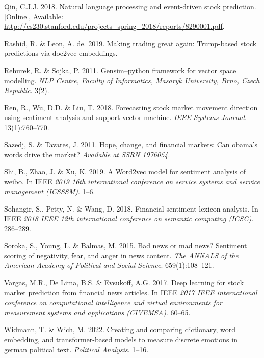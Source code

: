 \documentclass[11pt,preprint, authoryear]{elsarticle}
\numberwithin{equation}{section}
\numberwithin{figure}{section}
\numberwithin{table}{section}
\newlength{\cslhangindent}
\newenvironment{CSLReferences}%
  {\setlength{\parindent}{0pt}%
  \everypar{\setlength{\hangindent}{\cslhangindent}}\ignorespaces}%
  {\par}
\begin{document}
\begin{CSLReferences}
\leavevmode{}%
Qin, C.J.J. 2018. Natural language processing and event-driven stock
prediction. {[}Online{]}, Available:
\url{http://cs230.stanford.edu/projects_spring_2018/reports/8290001.pdf}.

\leavevmode{}%
Rashid, R. \& Leon, A. de. 2019. Making trading great again: Trump-based
stock predictions via doc2vec embeddings.

\leavevmode{}%
Rehurek, R. \& Sojka, P. 2011. Gensim--python framework for vector space
modelling. \emph{NLP Centre, Faculty of Informatics, Masaryk University,
Brno, Czech Republic}. 3(2).

\leavevmode{}%
Ren, R., Wu, D.D. \& Liu, T. 2018. Forecasting stock market movement
direction using sentiment analysis and support vector machine.
\emph{IEEE Systems Journal}. 13(1):760--770.

\leavevmode{}%
Sazedj, S. \& Tavares, J. 2011. Hope, change, and financial markets: Can
obama's words drive the market? \emph{Available at SSRN 1976054}.

\leavevmode{}%
Shi, B., Zhao, J. \& Xu, K. 2019. A Word2vec model for sentiment
analysis of weibo. In IEEE \emph{2019 16th international conference on
service systems and service management (ICSSSM)}. 1--6.

\leavevmode{}%
Sohangir, S., Petty, N. \& Wang, D. 2018. Financial sentiment lexicon
analysis. In IEEE \emph{2018 IEEE 12th international conference on
semantic computing (ICSC)}. 286--289.

\leavevmode{}%
Soroka, S., Young, L. \& Balmas, M. 2015. Bad news or mad news?
Sentiment scoring of negativity, fear, and anger in news content.
\emph{The ANNALS of the American Academy of Political and Social
Science}. 659(1):108--121.

\leavevmode{}%
Vargas, M.R., De Lima, B.S. \& Evsukoff, A.G. 2017. Deep learning for
stock market prediction from financial news articles. In IEEE \emph{2017
IEEE international conference on computational intelligence and virtual
environments for measurement systems and applications (CIVEMSA)}.
60--65.

\leavevmode{}%
Widmann, T. \& Wich, M. 2022.
\href{https://doi.org/10.1017/pan.2022.15}{Creating and comparing
dictionary, word embedding, and transformer-based models to measure
discrete emotions in german political text}. \emph{Political Analysis}.
1--16.


\end{CSLReferences}
\end{document}
